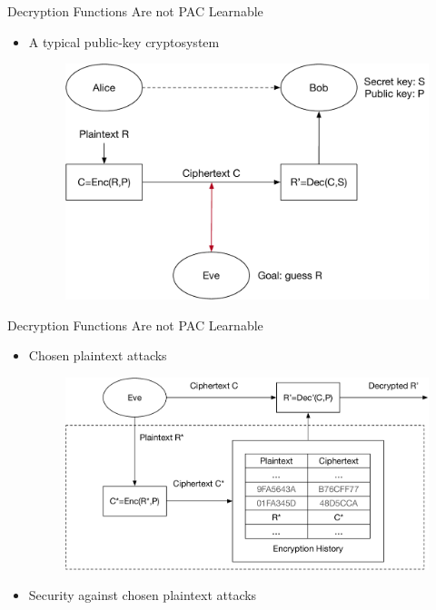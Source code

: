 \begin{frame}{Decryption Functions Are not PAC Learnable}
\begin{itemize}
    \item A typical public-key cryptosystem
    \begin{figure}
    \centering
    \includegraphics[width=.8\linewidth]{fig/PublicKeyCrypto.pdf}
    \end{figure}
\end{itemize}    
\end{frame}

\begin{frame}{Decryption Functions Are not PAC Learnable}
\begin{itemize}
    \item Chosen plaintext attacks    
    \begin{figure}
    \centering
    \includegraphics[width=.8\linewidth]{fig/CPA.pdf}
    \end{figure}
    \item Security against chosen plaintext attacks
\end{itemize}    
\end{frame}

